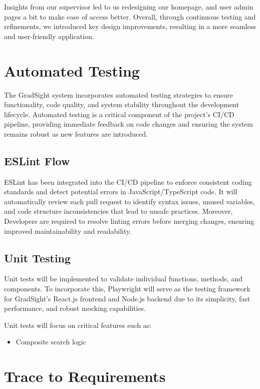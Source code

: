 \documentclass[12pt, titlepage]{article}
\begin{document}
Insights from our supervisor led to us redesigning our homepage, and user admin pages a bit to make ease of access better. Overall, through continuous testing and refinements, we introduced key design improvements, resulting in a more seamless and user-friendly application.

\section{Automated Testing}

The GradSight system incorporates automated testing strategies to ensure functionality, code quality, and system stability throughout the development lifecycle. Automated testing is a critical component of the project’s CI/CD pipeline, providing immediate feedback on code changes and ensuring the system remains robust as new features are introduced.

\subsection{ESLint Flow}

ESLint has been integrated into the CI/CD pipeline to enforce consistent coding standards and detect potential errors in JavaScript/TypeScript code. It will automatically review each pull request to identify syntax issues, unused variables, and code structure inconsistencies that lead to unsafe practices. Moreover, Developers are required to resolve linting errors before merging changes, ensuring improved maintainability and readability.

\subsection{Unit Testing}

Unit tests will be implemented to validate individual functions, methods, and components. To incorporate this, Playwright will serve as the testing framework for GradSight’s React.js frontend and Node.js backend due to its simplicity, fast performance, and robust mocking capabilities.

Unit tests will focus on critical features such as:

\begin{itemize}
    \item Composite search logic
\end{itemize}
		
\section{Trace to Requirements}
\end{document}
